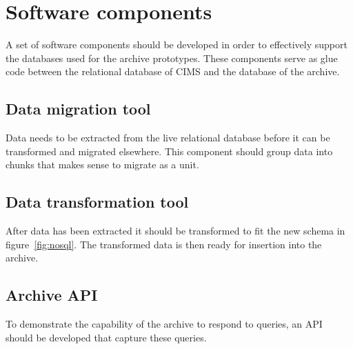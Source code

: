 \section{Software components}
A set of software components should be developed in order to effectively support the databases used for the archive prototypes. These components serve as glue code between the relational database of CIMS and the database of the archive. 

\subsection{Data migration tool}
Data needs to be extracted from the live relational database before it can be transformed and migrated elsewhere. This component should group data into chunks that makes sense to migrate as a unit.

\subsection{Data transformation tool}
After data has been extracted it should be transformed to fit the new schema in figure~\ref{fig:nosql}. The transformed data is then ready for insertion into the archive.

\subsection{Archive API}
To demonstrate the capability of the archive to respond to queries, an API should be developed that capture these queries. 



